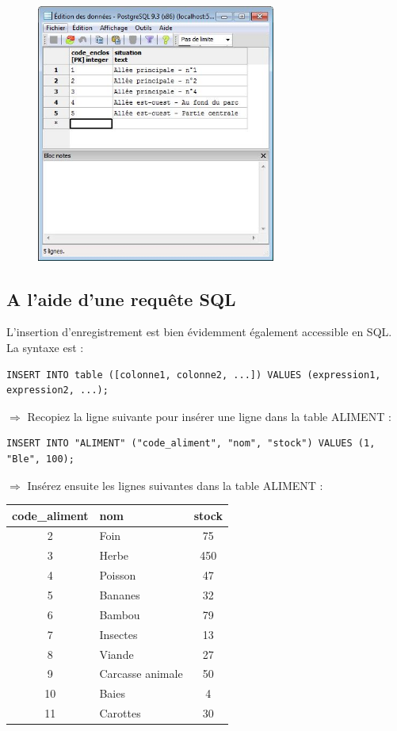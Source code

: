 \documentclass[11pt]{article}
\newcommand{\action}{$\Rightarrow$ }
\begin{document}
\begin{figure}[H]
	\center \includegraphics[width=0.7\textwidth]{img/pgadmin_fenetre_edition.jpg}\\[1em]
\end{figure}


\subsection{A l'aide d'une requête SQL}
L'insertion d'enregistrement est bien évidemment également accessible en SQL. La syntaxe est :
\begin{lstlisting}
INSERT INTO table ([colonne1, colonne2, ...]) VALUES (expression1, expression2, ...);
\end{lstlisting}

\action Recopiez la ligne suivante pour insérer une ligne dans la table ALIMENT :
\begin{lstlisting}
INSERT INTO "ALIMENT" ("code_aliment", "nom", "stock") VALUES (1, "Ble", 100);
\end{lstlisting}

\action Insérez ensuite les lignes suivantes dans la table ALIMENT :

\begin{center}
	\begin{tabular}{c|l|c}
		\textbf{code\_aliment} & \textbf{nom} & \textbf{stock} \\
		\hline
		2 & Foin & 75 \\
		3 & Herbe & 450 \\
		4 & Poisson & 47 \\
		5 & Bananes & 32 \\
		6 & Bambou & 79 \\
		7 & Insectes & 13 \\
		8 & Viande & 27 \\
		9 & Carcasse animale & 50 \\
		10 & Baies & 4 \\
		11 & Carottes & 30 \\
	\end{tabular}
\end{center}
\end{document}
